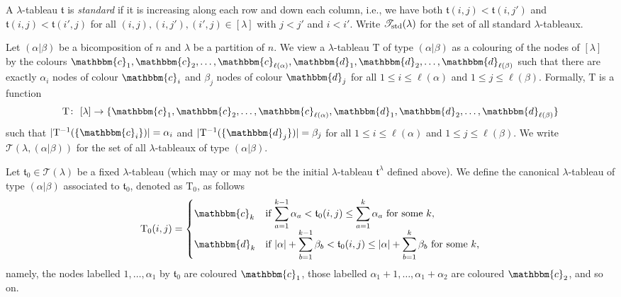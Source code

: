 \documentclass[pdftex]{sigma}
\renewcommand{\t}{\mathfrak{t}}
\newcommand{\TT}{\mathscr{T}}
\newcommand{\T}{\mathrm{T}}
\newcommand{\bb}[1]{\mathbbm{{#1}}}
\begin{document}
A $\lambda$-tableau $\t$ is {\em standard} if it is increasing along each row and down each column, i.e., we have both $\t(i,j) < \t(i,j')$ and $\t(i,j)< \t(i',j)$ for all $(i,j),(i,j'),(i',j) \in [\lambda]$ with $j < j'$ and $i < i'$. Write $\TT_{\rm{std}}(\lambda)$ for the set of all standard $\lambda$-tableaux.

Let $(\alpha|\beta)$ be a bicomposition of $n$ and $\lambda$ be a partition of $n$. We view a $\lambda$-tableau $\T$ of type $(\alpha|\beta)$ as a colouring of the nodes of $[\lambda]$ by the colours $\bb{c}_1,\bb{c}_2,\dotsc, \bb{c}_{\ell(\alpha)},\bb{d}_1,\bb{d}_2,\dotsc,\bb{d}_{\ell(\beta)}$ such that there are exactly $\alpha_i$ nodes of colour $\bb{c}_i$ and $\beta_j$ nodes of colour $\bb{d}_j$ for all $1 \leq i\leq \ell(\alpha)$ and $1\leq j\leq \ell(\beta)$. Formally, $\T$ is a function \begin{gather*}\T\colon \ [\lambda]\to \{\bb{c}_1,\bb{c}_2,\dotsc, \bb{c}_{\ell(\alpha)},\bb{d}_1,\bb{d}_2,\dotsc,\bb{d}_{\ell(\beta)} \}\end{gather*} such that $|\T^{-1}(\{\bb{c}_i\})|=\alpha_i$ and $|\T^{-1}(\{\bb{d}_j\})|=\beta_j$ for all $1 \leq i\leq \ell(\alpha)$ and $1\leq j\leq \ell(\beta)$. We write $\TT(\lambda, (\alpha|\beta))$ for the set of all $\lambda$-tableaux of type $(\alpha|\beta)$.

Let $\t_0 \in \TT(\lambda)$ be a fixed $\lambda$-tableau (which may or may not be the initial $\lambda$-tableau $\t^{\lambda}$ defined above). We define the canonical $\lambda$-tableau of type $(\alpha|\beta)$ associated to $\t_0$, denoted as $\T_0$, as follows
\begin{gather*}
\T_0(i,j) = \begin{cases}\bb{c}_k&\text{if $\displaystyle{\sum^{k-1}_{a=1} \alpha_a < \t_0(i,j) \leq \sum^{k}_{a=1} \alpha_a}$ for some $k$,}\\ \bb{d}_k&\text{if $\displaystyle{|\alpha|+\sum^{k-1}_{b=1} \beta_b < \t_0(i,j) \leq |\alpha|+\sum^{k}_{b=1} \beta_b}$ for some $k$,}\end{cases} \end{gather*} namely, the nodes labelled $1,\ldots,\alpha_1$ by $\t_0$ are coloured $\bb{c}_1$, those labelled $\alpha_1 + 1,\dotsc, \alpha_1 + \alpha_2$ are coloured $\bb{c}_2$, and so on.
\end{document}
